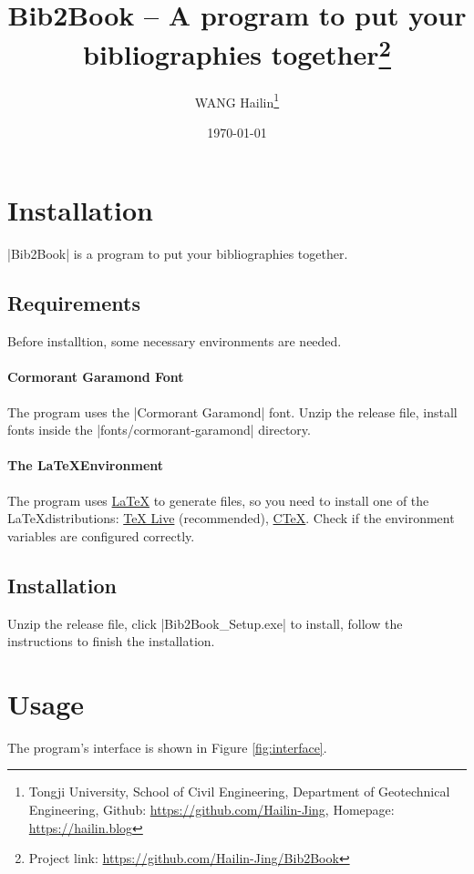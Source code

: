 \documentclass{article}
\title{Bib2Book -- A program to put your bibliographies together\footnote{Project link: \url{https://github.com/Hailin-Jing/Bib2Book}}}
\author{WANG Hailin\thanks{Tongji University, School of Civil Engineering, Department of Geotechnical Engineering, Github: \url{https://github.com/Hailin-Jing}, Homepage: \url{https://hailin.blog}}}
\date{\today}
\begin{document}
    \maketitle

    \section{Installation}

    |Bib2Book| is a program to put your bibliographies together. 

    \subsection{Requirements}

    Before installtion, some necessary environments are needed.

    \paragraph{Cormorant Garamond Font}

    The program uses the |Cormorant Garamond| font. Unzip the release file, install fonts inside the |fonts/cormorant-garamond| directory.

    \paragraph{The \LaTeX Environment}

    The program uses \href{https://www.latex-project.org}{\LaTeX} to generate files, so you need to install one of the \LaTeX distributions: \href{http://www.tug.org/texlive}{TeX Live} (recommended), \href{http://www.ctex.org/HomePage}{C\TeX}. Check if the environment variables are configured correctly.

    \subsection{Installation}

    Unzip the release file, click |Bib2Book_Setup.exe| to install, follow the instructions to finish the installation.

    \clearpage

    \section{Usage}

    The program's interface is shown in Figure \ref{fig:interface}.
\end{document}
